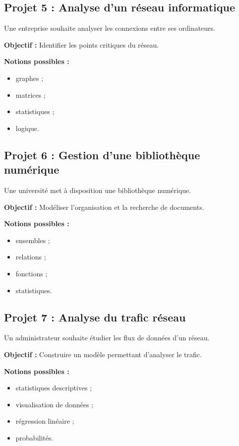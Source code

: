 \documentclass[12pt,a4paper]{article}
\begin{document}
\bigskip

\subsection*{Projet 5 : Analyse d'un réseau informatique}

Une entreprise souhaite analyser les connexions entre ses ordinateurs.

\textbf{Objectif :}
Identifier les points critiques du réseau.

\textbf{Notions possibles :}

\begin{itemize}
\item graphes ;
\item matrices ;
\item statistiques ;
\item logique.
\end{itemize}

\bigskip

\subsection*{Projet 6 : Gestion d'une bibliothèque numérique}

Une université met à disposition une bibliothèque numérique.

\textbf{Objectif :}
Modéliser l'organisation et la recherche de documents.

\textbf{Notions possibles :}

\begin{itemize}
\item ensembles ;
\item relations ;
\item fonctions ;
\item statistiques.
\end{itemize}

\bigskip

\subsection*{Projet 7 : Analyse du trafic réseau}

Un administrateur souhaite étudier les flux de données d'un réseau.

\textbf{Objectif :}
Construire un modèle permettant d'analyser le trafic.

\textbf{Notions possibles :}

\begin{itemize}
\item statistiques descriptives ;
\item visualisation de données ;
\item régression linéaire ;
\item probabilités.
\end{itemize}
\end{document}

